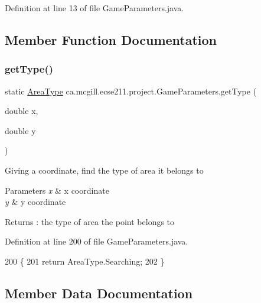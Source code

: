 Definition at line 13 of file Game\+Parameters.\+java.



\subsection{Member Function Documentation}
\mbox{\label{classca_1_1mcgill_1_1ecse211_1_1project_1_1_game_parameters_afa2d71de18f6276782a702d7b74066e3}} 
\subsubsection{\texorpdfstring{get\+Type()}{getType()}}
{\footnotesize\ttfamily static \hyperlink{enumca_1_1mcgill_1_1ecse211_1_1project_1_1_game_parameters_1_1_area_type}{Area\+Type} ca.\+mcgill.\+ecse211.\+project.\+Game\+Parameters.\+get\+Type (\begin{DoxyParamCaption}\item[{double}]{x,  }\item[{double}]{y }\end{DoxyParamCaption})\hspace{0.3cm}{\ttfamily [static]}}

Giving a coordinate, find the type of area it belongs to 
\begin{DoxyParams}{Parameters}
{\em x} & x coordinate \\
\hline
{\em y} & y coordinate \\
\hline
\end{DoxyParams}
\begin{DoxyReturn}{Returns}
\+: the type of area the point belongs to 
\end{DoxyReturn}


Definition at line 200 of file Game\+Parameters.\+java.


\begin{DoxyCode}
200                                                      \{
201     \textcolor{keywordflow}{return} AreaType.Searching;
202   \}
\end{DoxyCode}


\subsection{Member Data Documentation}
\mbox{\label{classca_1_1mcgill_1_1ecse211_1_1project_1_1_game_parameters_ae6824f16adf03173062767f99d46b6e0}} 
